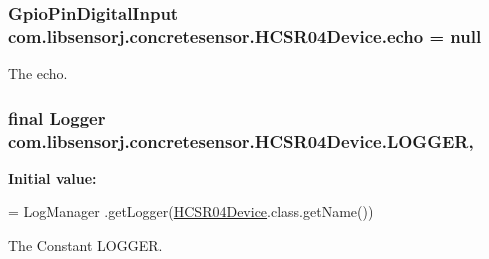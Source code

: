 \subsubsection[{echo}]{\setlength{\rightskip}{0pt plus 5cm}Gpio\+Pin\+Digital\+Input com.\+libsensorj.\+concretesensor.\+H\+C\+S\+R04\+Device.\+echo = null\hspace{0.3cm}{\ttfamily [private]}}\label{classcom_1_1libsensorj_1_1concretesensor_1_1HCSR04Device_adf8ec00f094aefba690583e5a349c99d}
The echo. \hypertarget{classcom_1_1libsensorj_1_1concretesensor_1_1HCSR04Device_a53449c0a7229928ddbb88c0d586cc63d}{}
\subsubsection[{L\+O\+G\+G\+E\+R}]{\setlength{\rightskip}{0pt plus 5cm}final Logger com.\+libsensorj.\+concretesensor.\+H\+C\+S\+R04\+Device.\+L\+O\+G\+G\+E\+R\hspace{0.3cm}{\ttfamily [static]}, {\ttfamily [private]}}\label{classcom_1_1libsensorj_1_1concretesensor_1_1HCSR04Device_a53449c0a7229928ddbb88c0d586cc63d}
{\bfseries Initial value\+:}
\begin{DoxyCode}
= LogManager
            .getLogger(\hyperlink{classcom_1_1libsensorj_1_1concretesensor_1_1HCSR04Device_ae0c7cdd02e374f360dff8d06a59b7c6d}{HCSR04Device}.class.getName())
\end{DoxyCode}
The Constant L\+O\+G\+G\+E\+R. \hypertarget{classcom_1_1libsensorj_1_1concretesensor_1_1HCSR04Device_aaa527e39259b9e1be1b6360a397b3d30}{}
